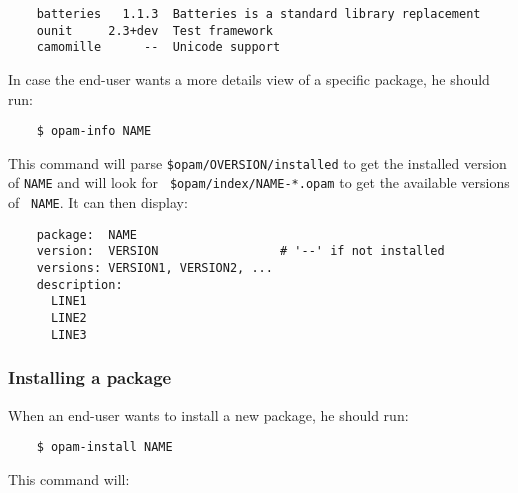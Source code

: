 \documentclass[a4paper,11pt]{article}
\begin{document}
\begin{verbatim}
    batteries   1.1.3  Batteries is a standard library replacement
    ounit     2.3+dev  Test framework
    camomille      --  Unicode support
\end{verbatim}


In case the end-user wants a more details view of a specific package,
he should run:

\begin{verbatim}
    $ opam-info NAME
\end{verbatim}

This command will parse {\tt \$opam/OVERSION/installed} to get the
installed version of {\tt NAME} and will look for {\tt
  \$opam/index/NAME-*.opam} to get the available versions of {\tt
  NAME}. It can then display:

\begin{verbatim}
    package:  NAME
    version:  VERSION                 # '--' if not installed
    versions: VERSION1, VERSION2, ...
    description:
      LINE1
      LINE2
      LINE3
\end{verbatim}

\subsubsection{Installing a package}
\label{install}

When an end-user wants to install a new package, he should run:

\begin{verbatim}
    $ opam-install NAME
\end{verbatim}

This command will:
\end{document}
